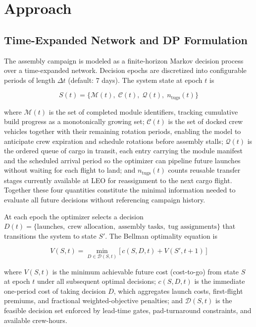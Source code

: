 \section{Approach}

\subsection{Time-Expanded Network and DP Formulation}

The assembly campaign is modeled as a finite-horizon Markov
decision process over a time-expanded network. Decision epochs are
discretized into configurable periods of length $\Delta t$
(default: 7 days). The system state at epoch $t$ is

\begin{equation}
  S(t) = \bigl\{\mathcal{M}(t),\; \mathcal{C}(t),\;
                \mathcal{Q}(t),\; n_{\mathrm{tugs}}(t)\bigr\}
\end{equation}

\noindent where $\mathcal{M}(t)$ is the set of completed module
identifiers, tracking cumulative build progress as a monotonically
growing set; $\mathcal{C}(t)$ is the set of docked crew vehicles
together with their remaining rotation periods, enabling the model
to anticipate crew expiration and schedule rotations before assembly
stalls; $\mathcal{Q}(t)$ is the ordered queue of cargo in transit,
each entry carrying the module manifest and the scheduled arrival
period so the optimizer can pipeline future launches without waiting
for each flight to land; and $n_{\mathrm{tugs}}(t)$ counts reusable
transfer stages currently available at LEO for reassignment to the
next cargo flight.
Together these four quantities constitute the minimal information
needed to evaluate all future decisions without referencing
campaign history.

At each epoch the optimizer selects a decision
$D(t) = \{\text{launches},\;\text{crew allocation},\;
\text{assembly tasks},\;\text{tug assignments}\}$
that transitions the system to state $S'$. The Bellman optimality
equation is

\begin{equation}
  V(S,t) = \min_{D \in \mathcal{D}(S,t)}
            \bigl[\, c(S, D, t) + V(S', t+1) \,\bigr]
\end{equation}

\noindent where $V(S,t)$ is the minimum achievable future cost
(cost-to-go) from state $S$ at epoch $t$ under all subsequent
optimal decisions; $c(S,D,t)$ is the immediate one-period cost of
taking decision $D$, which aggregates launch costs, first-flight
premiums, and fractional weighted-objective penalties; and
$\mathcal{D}(S,t)$ is the feasible decision set enforced by
lead-time gates, pad-turnaround constraints, and available crew-hours.

